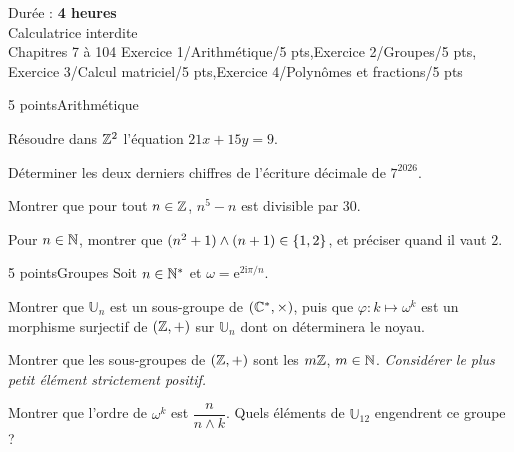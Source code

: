
  {Durée : \textbf{4 heures}\\Calculatrice interdite\\Chapitres 7 à 10}{4}
  {Exercice 1/Arithmétique/5 pts,Exercice 2/Groupes/5 pts,%
   Exercice 3/Calcul matriciel/5 pts,Exercice 4/Polynômes et fractions/5 pts}

\begin{exoEval}{5 points}{Arithmétique}
\begin{questions}
  \item Résoudre dans $\mathbb{Z}^{2}$ l'équation $21x+15y=9$.
  \item Déterminer les deux derniers chiffres de l'écriture décimale de
    $7^{2026}$.
  \item Montrer que pour tout $n\in\mathbb{Z}$, $n^{5}-n$ est divisible par $30$.
  \item Pour $n\in\mathbb{N}$, montrer que $(n^{2}+1)\wedge(n+1)\in\left\{1,2\right\}$, et
    préciser quand il vaut $2$.
\end{questions}
\end{exoEval}

\begin{exoEval}{5 points}{Groupes}
Soit $n\in\mathbb{N}^{*}$ et $\omega=\mathrm{e}^{2\mathrm{i}\pi/n}$.
\begin{questions}
  \item Montrer que $\mathbb{U}_n$ est un sous-groupe de $(\mathbb{C}^{*},\times)$,
    puis que $\varphi:k\mapsto\omega^{k}$ est un morphisme surjectif de
    $(\mathbb{Z},+)$ sur $\mathbb{U}_n$ dont on déterminera le noyau.
  \item Montrer que les sous-groupes de $(\mathbb{Z},+)$ sont les $m\mathbb{Z}$,
    $m\in\mathbb{N}$. \emph{Considérer le plus petit élément strictement positif.}
  \item Montrer que l'ordre de $\omega^{k}$ est $\dfrac{n}{n\wedge k}$.
    Quels éléments de $\mathbb{U}_{12}$ engendrent ce groupe ?
\end{questions}
\end{exoEval}


